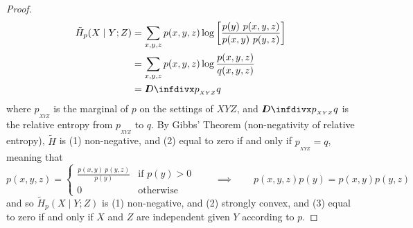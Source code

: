 \documentclass{article}
\begin{document}
\begin{proof}
	\begin{align*}
		\tilde H_p(X \mid Y; Z) &= \sum_{x,y, z}  p(x,y ,z) \log \left[\frac{p(y)\ p(x,y,z)}{p(x,y)\ p(y,z)} \right]  \\ %
		&= \sum_{x,y, z}  p(x,y ,z) \log \frac{p(x,y,z)}{q(x,y,z)}  \\
		&= \kldiv{p_{_{XYZ}}}{q}
	\end{align*}
	where $p_{_{XYZ}}$ is the marginal of $p$ on the settings of $XYZ$, and $\kldiv{p_{_{XYZ}}}{q}$ is the relative entropy from $p_{_{XYZ}}$ to $q$. By Gibbs' Theorem (non-negativity of relative entropy), $\tilde H$ is  (1) non-negative, and (2) equal to zero if and only if $p_{_{XYZ}} = q$, meaning that 
	\[  p(x,y,z) =\begin{cases} \frac{p(x,y)\ p(y,z)}{p(y)} & \text{if }p(y) > 0\\ 0 & \text{otherwise} \end{cases} \qquad \implies \qquad p(x,y,z) p(y) = p(x,y) p(y, z) \] 
	and so $\tilde H_p(X \mid Y; Z)$ is (1) non-negative, and (2) strongly convex, and (3) equal to zero if and only if $X$ and $Z$ are independent given $Y$ according to $p$.
\end{proof}
\end{document}
